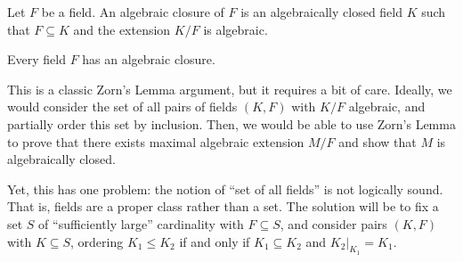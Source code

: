 \documentclass[10pt]{mypackage}
\begin{document}
\begin{definition}
  Let $F$ be a field. An algebraic closure of $F$ is an algebraically closed field $K$ such that $F\subseteq K$ and the extension $K/F$ is algebraic.
\end{definition}
\begin{theorem}
  Every field $F$ has an algebraic closure.
\end{theorem}
This is a classic Zorn's Lemma argument, but it requires a bit of care. Ideally, we would consider the set of all pairs of fields $\left( K,F \right)$ with $K/F$ algebraic, and partially order this set by inclusion. Then, we would be able to use Zorn's Lemma to prove that there exists maximal algebraic extension $M/F$ and show that $M$ is algebraically closed.

Yet, this has one problem: the notion of ``set of all fields'' is not logically sound. That is, fields are a proper class rather than a set. The solution will be to fix a set $S$ of ``sufficiently large'' cardinality with $F\subseteq S$, and consider pairs $\left( K,F \right)$ with $K\subseteq S$, ordering $K_1\leq K_2$ if and only if $K_1\subseteq K_2$ and $K_2|_{K_1} = K_1$.
\end{document}
